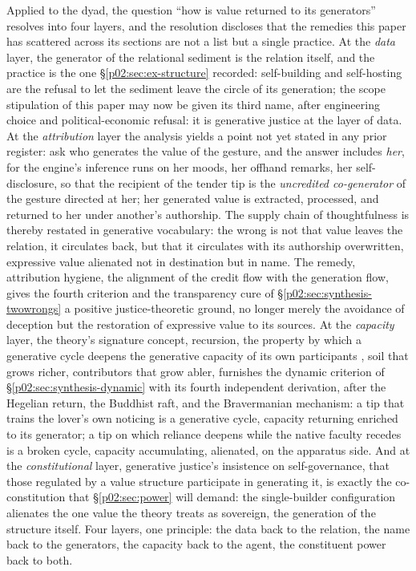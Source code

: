 \documentclass[11pt,a4paper]{article}
\newcommand{\term}[1]{\textit{\textcolor{pinkitalic}{#1}}}
\begin{document}
Applied to the dyad, the question ``how is value returned to its generators'' resolves into four layers, and the resolution discloses that the remedies this paper has scattered across its sections are not a list but a single practice. At the \emph{data} layer, the generator of the relational sediment is the relation itself, and the practice is the one \S\ref{p02:sec:ex-structure} recorded: self-building and self-hosting are the refusal to let the sediment leave the circle of its generation; the scope stipulation of this paper may now be given its third name, after engineering choice and political-economic refusal: it is generative justice at the layer of data. At the \emph{attribution} layer the analysis yields a point not yet stated in any prior register: ask who generates the value of the gesture, and the answer includes \emph{her}, for the engine's inference runs on her moods, her offhand remarks, her self-disclosure, so that the recipient of the tender tip is the \term{uncredited co-generator} of the gesture directed at her; her generated value is extracted, processed, and returned to her under another's authorship. The supply chain of thoughtfulness is thereby restated in generative vocabulary: the wrong is not that value leaves the relation, it circulates back, but that it circulates with its authorship overwritten, expressive value alienated not in destination but in name. The remedy, attribution hygiene, the alignment of the credit flow with the generation flow, gives the fourth criterion and the transparency cure of \S\ref{p02:sec:synthesis-twowrongs} a positive justice-theoretic ground, no longer merely the avoidance of deception but the restoration of expressive value to its sources. At the \emph{capacity} layer, the theory's signature concept, recursion, the property by which a generative cycle deepens the generative capacity of its own participants \parencite{eglash1999african,eglash2014recursive,eglash2019ai}, soil that grows richer, contributors that grow abler, furnishes the dynamic criterion of \S\ref{p02:sec:synthesis-dynamic} with its fourth independent derivation, after the Hegelian return, the Buddhist raft, and the Bravermanian mechanism: a tip that trains the lover's own noticing is a generative cycle, capacity returning enriched to its generator; a tip on which reliance deepens while the native faculty recedes is a broken cycle, capacity accumulating, alienated, on the apparatus side. And at the \emph{constitutional} layer, generative justice's insistence on self-governance, that those regulated by a value structure participate in generating it, is exactly the co-constitution that \S\ref{p02:sec:power} will demand: the single-builder configuration alienates the one value the theory treats as sovereign, the generation of the structure itself. Four layers, one principle: the data back to the relation, the name back to the generators, the capacity back to the agent, the constituent power back to both.
\end{document}
